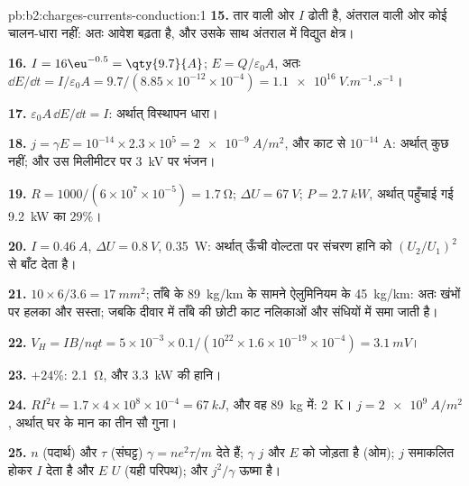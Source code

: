 \begin{solution}{pb:b2:charges-currents-conduction:1}
\textbf{15.} तार वाली ओर $I$ ढोती है, अंतराल वाली ओर कोई चालन-धारा
नहीं: अतः आवेश बढ़ता है, और उसके साथ अंतराल में विद्युत क्षेत्र।

\textbf{16.} $I = 16\eu^{-0.5} = \qty{9.7}{A}$; $E = Q/\varepsilon_0A$, अतः $\dd E/\dd t = I/\varepsilon_0A
= 9.7/(8.85 \times 10^{-12} \times 10^{-4}) = \qty{1.1e16}{V.m^{-1}.s^{-1}}$।

\textbf{17.} $\varepsilon_0A\,\dd E/\dd t = I$: अर्थात् विस्थापन धारा।

\textbf{18.} $j = \gamma E = 10^{-14} \times 2.3 \times 10^5 = \qty{2e-9}{A/m^2}$, और काट से $10^{-14}$ A:
अर्थात् कुछ नहीं; और उस मिलीमीटर पर \qty{3}{kV} पर भंजन।

\textbf{19.} $R = 1000/(6 \times 10^7 \times 10^{-5}) = \qty{1.7}{\ohm}$; $\Delta U = \qty{67}{V}$; $P =
\qty{2.7}{kW}$, अर्थात् पहुँचाई गई \qty{9.2}{kW} का $29\%$।

\textbf{20.} $I = \qty{0.46}{A}$, $\Delta U = \qty{0.8}{V}$, \qty{0.35}{W}: अर्थात् ऊँची वोल्टता पर
संचरण हानि को $(U_2/U_1)^2$ से बाँट देता है।

\textbf{21.} $10 \times 6/3.6 = \qty{17}{mm^2}$; ताँबे के \qty{89}{kg/km} के सामने
ऐलुमिनियम के \qty{45}{kg/km}: अतः खंभों पर हलका और सस्ता; जबकि दीवार में
ताँबे की छोटी काट नलिकाओं और संधियों में समा जाती है।

\textbf{22.} $V_H = IB/nqt = 5 \times 10^{-3} \times 0.1/(10^{22} \times 1.6 \times 10^{-19} \times 10^{-4}) =
\qty{3.1}{mV}$।

\textbf{23.} $+24\%$: \qty{2.1}{\ohm}, और \qty{3.3}{kW} की हानि।

\textbf{24.} $RI^2t = 1.7 \times 4 \times 10^8 \times 10^{-4} = \qty{67}{kJ}$, और वह \qty{89}{kg} में: \qty{2}{K}।
$j = \qty{2e9}{A/m^2}$, अर्थात् घर के मान का तीन सौ गुना।

\textbf{25.} $n$ (पदार्थ) और $\tau$ (संघट्ट) $\gamma = ne^2\tau/m$ देते हैं;
$\gamma$ $j$ और $E$ को जोड़ता है (ओम); $j$ समाकलित होकर $I$ देता है और $E$ $U$ (यही
परिपथ); और $j^2/\gamma$ ऊष्मा है।
\end{solution}
